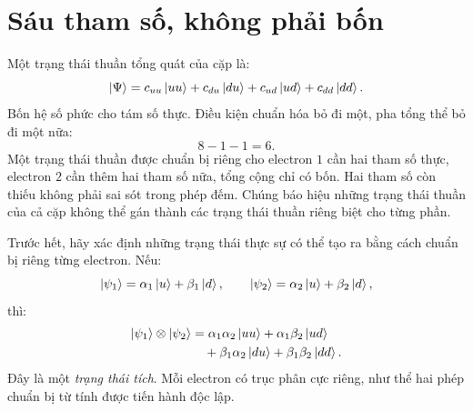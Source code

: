 \begin{classroomqa}
\end{classroomqa}

\begin{classroomqa}
\end{classroomqa}

\section{Sáu tham số, không phải bốn}

Một trạng thái thuần tổng quát của cặp là:
\begin{equation}
  \left\lvert\Psi\right\rangle
  =
  c_{uu}\left\lvert uu\right\rangle
  +c_{du}\left\lvert du\right\rangle
  +c_{ud}\left\lvert ud\right\rangle
  +c_{dd}\left\lvert dd\right\rangle.
  \label{eq:l04-general-two-spin-state}
\end{equation}
Bốn hệ số phức cho tám số thực. Điều kiện chuẩn hóa bỏ đi một, pha tổng thể bỏ đi một nữa:
\begin{equation}
  8-1-1=6.
  \label{eq:l04-two-spin-parameter-count}
\end{equation}
Một trạng thái thuần được chuẩn bị riêng cho electron \(1\) cần hai tham số thực, electron \(2\) cần thêm hai tham số nữa, tổng cộng chỉ có bốn. Hai tham số còn thiếu không phải sai sót trong phép đếm. Chúng báo hiệu những trạng thái thuần của cả cặp không thể gán thành các trạng thái thuần riêng biệt cho từng phần.

Trước hết, hãy xác định những trạng thái thực sự có thể tạo ra bằng cách chuẩn bị riêng từng electron. Nếu:
\begin{equation}
  \left\lvert\psi_1\right\rangle=\alpha_1\left\lvert u\right\rangle+\beta_1\left\lvert d\right\rangle,
  \qquad
  \left\lvert\psi_2\right\rangle=\alpha_2\left\lvert u\right\rangle+\beta_2\left\lvert d\right\rangle,
\end{equation}
thì:
\begin{align}
  \left\lvert\psi_1\right\rangle\otimes\left\lvert\psi_2\right\rangle
  &=
  \alpha_1\alpha_2\left\lvert uu\right\rangle
  +\alpha_1\beta_2\left\lvert ud\right\rangle
  \notag\\
  &\quad
  +\beta_1\alpha_2\left\lvert du\right\rangle
  +\beta_1\beta_2\left\lvert dd\right\rangle.
  \label{eq:l04-product-expansion}
\end{align}
Đây là một \emph{trạng thái tích}. Mỗi electron có trục phân cực riêng, như thể hai phép chuẩn bị từ tính được tiến hành độc lập.

